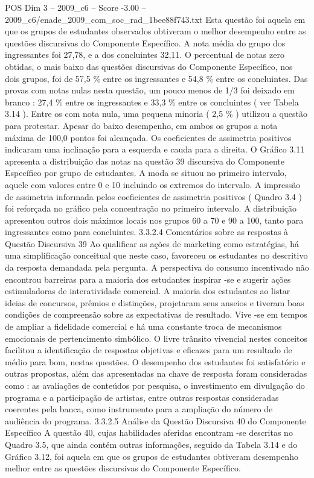 \begin{textsample}{POS Dim 3 – 2009\_c6 – Score -3.00 – 2009\_c6/enade\_2009\_com\_soc\_rad\_1bee88f743.txt}
Esta questão foi aquela em que os grupos de estudantes observados obtiveram o melhor desempenho entre as questões discursivas do Componente Específico.
A nota média do grupo dos ingressantes foi 27,78, e a dos concluintes 32,11.
O percentual de notas zero obtidas, o mais baixo das questões discursivas do Componente Específico, nos dois grupos, foi de 57,5 \% entre os ingressantes e 54,8 \% entre os concluintes.
Das provas com notas nulas nesta questão, um pouco menos de 1/3 foi deixado em branco : 27,4 \% entre os ingressantes e 33,3 \% entre os concluintes ( ver Tabela 3.14 ).
Entre os com nota nula, uma pequena minoria ( 2,5 \% ) utilizou a questão para protestar.
Apesar do baixo desempenho, em ambos os grupos a nota máxima de 100,0 pontos foi alcançada.
Os coeficientes de assimetria positivos indicaram uma inclinação para a esquerda e cauda para a direita.
O Gráfico 3.11 apresenta a distribuição das notas na questão 39 discursiva do Componente Específico por grupo de estudantes.
A moda se situou no primeiro intervalo, aquele com valores entre 0 e 10 incluindo os extremos do intervalo.
A impressão de assimetria informada pelos coeficientes de assimetria positivos ( Quadro 3.4 ) foi reforçada no gráfico pela concentração no primeiro intervalo.
A distribuição apresentou outros dois máximos locais nos grupos 60 a 70 e 90 a 100, tanto para ingressantes como para concluintes. 3.3.2.4 Comentários sobre as respostas à Questão Discursiva 39 Ao qualificar as ações de marketing como estratégias, há uma simplificação conceitual que neste caso, favoreceu os estudantes no descritivo da resposta demandada pela pergunta.
A perspectiva do consumo incentivado não encontrou barreiras para a maioria dos estudantes inspirar -se e sugerir ações estimuladoras de interatividade comercial.
A maioria dos estudantes ao listar ideias de concursos, prêmios e distinções, projetaram seus anseios e tiveram boas condições de compreensão sobre as expectativas de resultado.
Vive -se em tempos de ampliar a fidelidade comercial e há uma constante troca de mecanismos emocionais de pertencimento simbólico.
O livre trânsito vivencial nestes conceitos facilitou a identificação de respostas objetivas e eficazes para um resultado de médio para bom, nestas questões.
O desempenho dos estudantes foi satisfatório e outras propostas, além das apresentadas na chave de resposta foram consideradas como : as avaliações de conteúdos por pesquisa, o investimento em divulgação do programa e a participação de artistas, entre outras respostas consideradas coerentes pela banca, como instrumento para a ampliação do número de audiência do programa. 3.3.2.5 Análise da Questão Discursiva 40 do Componente Específico A questão 40, cujas habilidades aferidas encontram -se descritas no Quadro 3.5, que ainda contém outras informações, seguido da Tabela 3.14 e do Gráfico 3.12, foi aquela em que os grupos de estudantes obtiveram desempenho melhor entre as questões discursivas do Componente Específico.

\end{textsample}
